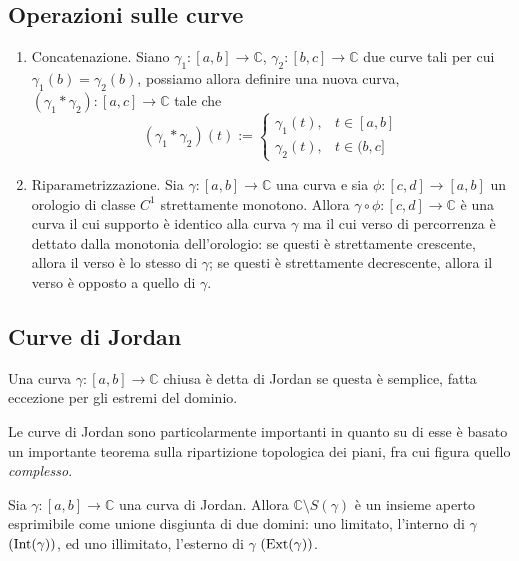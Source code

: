    \subsection{Operazioni sulle curve}
            \begin{enumerate}
                \item Concatenazione. Siano $\gamma_{1}: [a, b] \rightarrow \mathbb{C}$, $\gamma_{2}: [b, c] \rightarrow \mathbb{C}$ due curve tali per cui $\gamma_{1}(b) = \gamma_{2}(b)$, possiamo allora definire una nuova curva, $(\gamma_{1} * \gamma_{2}): [a, c] \rightarrow \mathbb{C}$ tale che
                \[
                    (\gamma_{1} * \gamma_{2})(t) :=
                    \begin{cases}
                        \gamma_{1}(t), & t \in [a, b] \\
                        \gamma_{2}(t), & t \in (b, c]
                    \end{cases}
                \]

                \item Riparametrizzazione. Sia $\gamma: [a, b] \rightarrow \mathbb{C}$ una curva e sia $\phi: [c, d] \rightarrow [a, b]$ un orologio di classe $C^{1}$ strettamente monotono.
                Allora $\gamma \circ \phi: [c, d] \rightarrow \mathbb{C}$ è una curva il cui supporto è identico alla curva $\gamma$ ma il cui verso di percorrenza è dettato dalla monotonia dell'orologio: se questi è strettamente crescente, allora il verso è lo stesso di $\gamma$; se questi è strettamente decrescente, allora il verso è opposto a quello di $\gamma$.
            \end{enumerate}

    \subsection{Curve di Jordan}
            \begin{definition}
                Una curva $\gamma: [a, b] \rightarrow \mathbb{C}$ chiusa è detta di Jordan se questa è semplice, fatta eccezione per gli estremi del dominio.
            \end{definition}

            Le curve di Jordan sono particolarmente importanti in quanto su di esse è basato un importante teorema sulla ripartizione topologica dei piani, fra cui figura quello \textit{complesso}.

            \begin{theorem}
                Sia $\gamma: [a, b] \rightarrow \mathbb{C}$ una curva di Jordan.
                Allora $\mathbb{C} \setminus S(\gamma)$ è un insieme aperto esprimibile come unione disgiunta di due domini: uno limitato, l'interno di $\gamma$ $(\textnormal{Int}(\gamma))$, ed uno illimitato, l'esterno di $\gamma$ $(\textnormal{Ext}(\gamma))$.
            \end{theorem}

